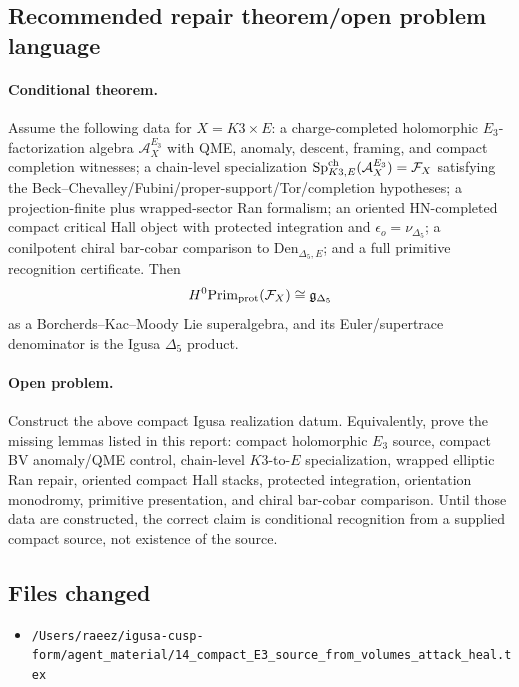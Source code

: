 \subsection{Recommended repair theorem/open problem language}

\paragraph{Conditional theorem.}
Assume the following data for \(X=K3\times E\):
a charge-completed holomorphic \(E_3\)-factorization algebra
\(\mathcal A_X^{E_3}\) with QME, anomaly, descent, framing, and compact
completion witnesses; a chain-level specialization
\(\mathrm{Sp}^{\mathrm{ch}}_{K3,E}(\mathcal A_X^{E_3})=\mathcal F_X\) satisfying the
Beck--Chevalley/Fubini/proper-support/Tor/completion hypotheses; a
projection-finite plus wrapped-sector Ran formalism; an oriented
HN-completed compact critical Hall object with protected integration and
\(\epsilon_o=\nu_{\Delta_5}\); a conilpotent chiral bar-cobar comparison
to \(\mathrm{Den}_{\Delta_5,E}\); and a full primitive recognition
certificate.  Then
\[
       H^0\mathrm{Prim}_{\mathrm{prot}}(\mathcal F_X)\cong \mathfrak g_{\Delta_5}
\]
as a Borcherds--Kac--Moody Lie superalgebra, and its Euler/supertrace
denominator is the Igusa \(\Delta_5\) product.

\paragraph{Open problem.}
Construct the above compact Igusa realization datum.  Equivalently,
prove the missing lemmas listed in this report: compact holomorphic
\(E_3\) source, compact BV anomaly/QME control, chain-level
\(K3\)-to-\(E\) specialization, wrapped elliptic Ran repair, oriented
compact Hall stacks, protected integration, orientation monodromy,
primitive presentation, and chiral bar-cobar comparison.  Until those
data are constructed, the correct claim is conditional recognition from
a supplied compact source, not existence of the source.

\subsection{Files changed}

\begin{itemize}
\item \verb|/Users/raeez/igusa-cusp-form/agent_material/14_compact_E3_source_from_volumes_attack_heal.tex|
\end{itemize}

